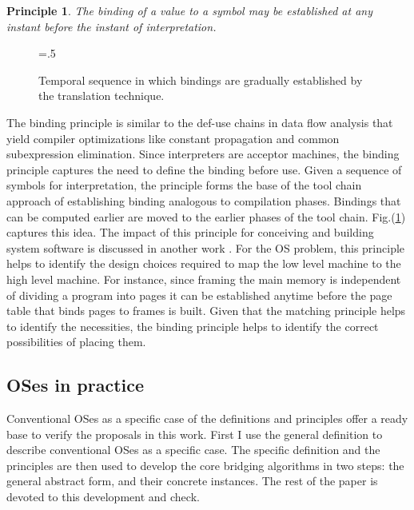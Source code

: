 \documentclass[draft]{article}
\def\figdir{.}
\newcounter{theprin}
\newtheorem{principle}[theprin]{Principle}
\begin{document}
\begin{principle}
  \label{binding:principle}
  The binding of a value to a symbol may be established at any instant
  before the instant of interpretation.
\end{principle}

\begin{figure}[ht]
  \centering
  \epsfxsize=.5\linewidth
  \epsffile{\figdir/binding-003.eps}
  \caption[Temporal sequence  of bindings]{Temporal sequence  in which
    bindings are gradually established by the translation technique.}
  \label{fig:translations:binding:seq}
\end{figure}
The binding  principle is similar to  the def-use chains  in data flow
analysis that  yield compiler optimizations  like constant propagation
and common subexpression elimination.  Since interpreters are acceptor
machines,  the  binding principle  captures  the  need  to define  the
binding before  use.  Given a sequence of  symbols for interpretation,
the  principle  forms   the  base  of  the  tool   chain  approach  of
establishing binding  analogous to compilation  phases.  Bindings that
can be  computed earlier are moved  to the earlier phases  of the tool
chain.   Fig.(\ref{fig:translations:binding:seq}) captures  this idea.
The  impact  of this  principle  for  conceiving  and building  system
software  is discussed  in  another work  \cite{amv:ss}.   For the  OS
problem, this principle helps  to identify the design choices required
to map the low level machine to the high level machine.  For instance,
since framing  the main  memory is independent  of dividing  a program
into pages  it can be established  anytime before the  page table that
binds pages  to frames  is built.  Given  that the  matching principle
helps  to identify  the necessities,  the binding  principle  helps to
identify the correct possibilities of placing them.

\subsection{OSes in practice}
\label{sec:partical:oses}

Conventional OSes as a specific case of the definitions and principles
offer a ready base to verify  the proposals in this work.  First I use
the  general definition to  describe conventional  OSes as  a specific
case.  The  specific definition  and the principles  are then  used to
develop  the  core  bridging  algorithms  in two  steps:  the  general
abstract form, and their concrete instances.  The rest of the paper is
devoted to this development and check.
\end{document}
